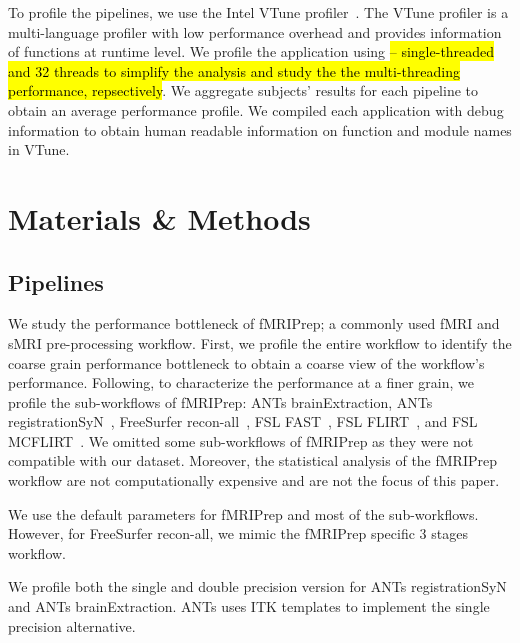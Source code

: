 \documentclass[conference]{IEEEtran}
\newcommand{\TG}[1]{\color{blue}\textsc{From Tristan: }#1\color{black}}
\newcommand{\HL}[1]{\hl{#1}}
\begin{document}

To profile the pipelines, we use the Intel VTune profiler~\cite{vtune-profiler}. The VTune profiler is a multi-language profiler with low performance overhead and provides information of functions at runtime level. We profile the application using \HL{-- single-threaded and 32 threads to simplify the analysis and study the the multi-threading performance, repsectively}. We aggregate subjects' results for each pipeline to obtain an average performance profile. We compiled each application with debug information to obtain human readable information on function and module names in VTune.

\section{Materials \& Methods}
\subsection{Pipelines}
We study the performance bottleneck of fMRIPrep; a commonly used fMRI and sMRI pre-processing workflow. First, we profile the entire workflow to identify the coarse grain performance bottleneck to obtain a coarse view of the workflow's performance. Following, to characterize the performance at a finer grain, we profile the sub-workflows of fMRIPrep: ANTs brainExtraction, ANTs registrationSyN~\cite{Avants2008-ea}, FreeSurfer recon-all~\cite{Dale1999-wu}, FSL FAST~\cite{Zhang2001-hx}, FSL FLIRT~\cite{Jenkinson2002-od,Jenkinson2001-eu,Greve2009-dw}, and FSL MCFLIRT~\cite{Jenkinson2002-od}. We omitted some sub-workflows of fMRIPrep as they were not compatible with our dataset. Moreover, the statistical analysis of the fMRIPrep workflow are not computationally expensive and are not the focus of this paper.

We use the default parameters for fMRIPrep and most of the sub-workflows. However, for FreeSurfer recon-all, we mimic the fMRIPrep specific 3 stages workflow.

We profile both the single and double precision version for ANTs registrationSyN and ANTs brainExtraction. ANTs uses ITK templates to implement the single precision alternative.
\end{document}
